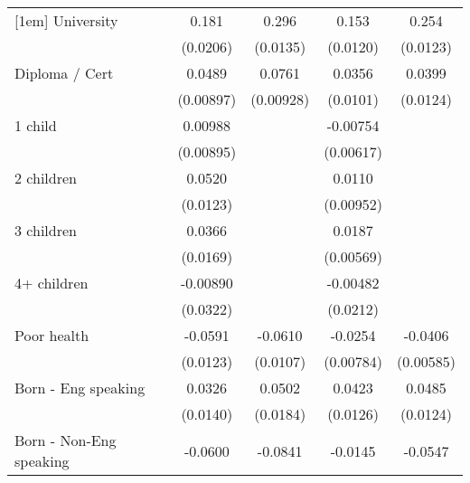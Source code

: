 {\begin{tabular}{l*{4}{c}}
[1em]
University          &       0.181\sym{***}&       0.296\sym{***}&       0.153\sym{***}&       0.254\sym{***}\\
                    &    (0.0206)         &    (0.0135)         &    (0.0120)         &    (0.0123)         \\
[1em]
Diploma / Cert      &      0.0489\sym{***}&      0.0761\sym{***}&      0.0356\sym{***}&      0.0399\sym{**} \\
                    &   (0.00897)         &   (0.00928)         &    (0.0101)         &    (0.0124)         \\
[1em]
1 child             &     0.00988         &                     &    -0.00754         &                     \\
                    &   (0.00895)         &                     &   (0.00617)         &                     \\
[1em]
2 children          &      0.0520\sym{***}&                     &      0.0110         &                     \\
                    &    (0.0123)         &                     &   (0.00952)         &                     \\
[1em]
3 children          &      0.0366\sym{*}  &                     &      0.0187\sym{***}&                     \\
                    &    (0.0169)         &                     &   (0.00569)         &                     \\
[1em]
4+ children         &    -0.00890         &                     &    -0.00482         &                     \\
                    &    (0.0322)         &                     &    (0.0212)         &                     \\
[1em]
Poor health         &     -0.0591\sym{***}&     -0.0610\sym{***}&     -0.0254\sym{**} &     -0.0406\sym{***}\\
                    &    (0.0123)         &    (0.0107)         &   (0.00784)         &   (0.00585)         \\
[1em]
Born - Eng speaking &      0.0326\sym{*}  &      0.0502\sym{**} &      0.0423\sym{***}&      0.0485\sym{***}\\
                    &    (0.0140)         &    (0.0184)         &    (0.0126)         &    (0.0124)         \\
[1em]
Born - Non-Eng speaking&     -0.0600\sym{***}&     -0.0841\sym{***}&     -0.0145         &     -0.0547\sym{***}\\

\end{tabular}}
